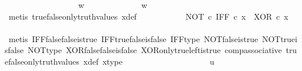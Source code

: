 \begin{isabellebody}
\ \ \ \ \ \ \isamarkupfalse%
\ \isanewline
\ \ \ \ \ \ \ \ \isamarkupfalse%
\ {\isachardoublequoteopen}w\ {\isasymnoteq}\ {\isasymt}{\isachardoublequoteclose}\isanewline
\ \ \ \ \ \ \ \ \isamarkupfalse%
\ \isamarkupfalse%
\ {\isachardoublequoteopen}w\ {\isacharequal}{\kern0pt}\ {\isasymf}{\isachardoublequoteclose}\isanewline
\ \ \ \ \ \ \ \ \ \ \isamarkupfalse%
\ {\isacharparenleft}{\kern0pt}metis\ true{\isacharunderscore}{\kern0pt}false{\isacharunderscore}{\kern0pt}only{\isacharunderscore}{\kern0pt}truth{\isacharunderscore}{\kern0pt}values\ x{\isacharunderscore}{\kern0pt}def{\isacharparenright}{\kern0pt}\isanewline
\ \ \ \ \ \ \ \ \isamarkupfalse%
\ \isamarkupfalse%
\ {\isachardoublequoteopen}{\isacharparenleft}{\kern0pt}NOT\ {\isasymcirc}\isactrlsub c\ IFF{\isacharparenright}{\kern0pt}\ {\isasymcirc}\isactrlsub c\ x\ {\isacharequal}{\kern0pt}\ XOR\ {\isasymcirc}\isactrlsub c\ x{\isachardoublequoteclose}\isanewline
\ \ \ \ \ \ \ \ \ \ \isamarkupfalse%
\ {\isacharparenleft}{\kern0pt}metis\ IFF{\isacharunderscore}{\kern0pt}false{\isacharunderscore}{\kern0pt}false{\isacharunderscore}{\kern0pt}is{\isacharunderscore}{\kern0pt}true\ IFF{\isacharunderscore}{\kern0pt}true{\isacharunderscore}{\kern0pt}false{\isacharunderscore}{\kern0pt}is{\isacharunderscore}{\kern0pt}false\ IFF{\isacharunderscore}{\kern0pt}type\ NOT{\isacharunderscore}{\kern0pt}false{\isacharunderscore}{\kern0pt}is{\isacharunderscore}{\kern0pt}true\ NOT{\isacharunderscore}{\kern0pt}true{\isacharunderscore}{\kern0pt}is{\isacharunderscore}{\kern0pt}false\ NOT{\isacharunderscore}{\kern0pt}type\ XOR{\isacharunderscore}{\kern0pt}false{\isacharunderscore}{\kern0pt}false{\isacharunderscore}{\kern0pt}is{\isacharunderscore}{\kern0pt}false\ XOR{\isacharunderscore}{\kern0pt}only{\isacharunderscore}{\kern0pt}true{\isacharunderscore}{\kern0pt}left{\isacharunderscore}{\kern0pt}is{\isacharunderscore}{\kern0pt}true\ comp{\isacharunderscore}{\kern0pt}associative{}\ true{\isacharunderscore}{\kern0pt}false{\isacharunderscore}{\kern0pt}only{\isacharunderscore}{\kern0pt}truth{\isacharunderscore}{\kern0pt}values\ x{\isacharunderscore}{\kern0pt}def\ x{\isacharunderscore}{\kern0pt}type{\isacharparenright}{\kern0pt}\isanewline
\ \ \ \ \ \ \isamarkupfalse%
\isanewline
\ \ \ \ \isamarkupfalse%
\ \isanewline
\ \ \ \ \ \ \isamarkupfalse%
\ {\isachardoublequoteopen}u\ {\isasymnoteq}\ {\isasymt}{\isachardoublequoteclose}\isanewline

\end{isabellebody}
